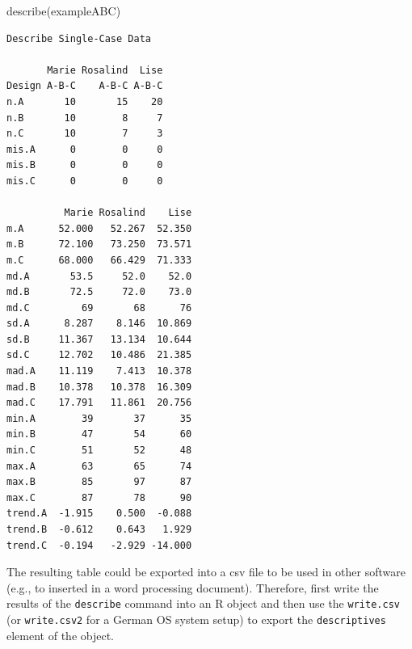 \documentclass[
]{book}
\newenvironment{Shaded}{\begin{snugshade}}{\end{snugshade}}
\newcommand{\AttributeTok}[1]{\textcolor[rgb]{0.77,0.63,0.00}{#1}}
\newcommand{\CommentTok}[1]{\textcolor[rgb]{0.56,0.35,0.01}{\textit{#1}}}
\newcommand{\FunctionTok}[1]{\textcolor[rgb]{0.00,0.00,0.00}{#1}}
\newcommand{\NormalTok}[1]{#1}
\newcommand{\OtherTok}[1]{\textcolor[rgb]{0.56,0.35,0.01}{#1}}
\newcommand{\SpecialCharTok}[1]{\textcolor[rgb]{0.00,0.00,0.00}{#1}}
\newcommand{\StringTok}[1]{\textcolor[rgb]{0.31,0.60,0.02}{#1}}
\begin{document}
\begin{Shaded}
\begin{Highlighting}[]
\FunctionTok{describe}\NormalTok{(exampleABC)}
\end{Highlighting}
\end{Shaded}

\begin{verbatim}
Describe Single-Case Data

       Marie Rosalind  Lise
Design A-B-C    A-B-C A-B-C
n.A       10       15    20
n.B       10        8     7
n.C       10        7     3
mis.A      0        0     0
mis.B      0        0     0
mis.C      0        0     0

          Marie Rosalind    Lise
m.A      52.000   52.267  52.350
m.B      72.100   73.250  73.571
m.C      68.000   66.429  71.333
md.A       53.5     52.0    52.0
md.B       72.5     72.0    73.0
md.C         69       68      76
sd.A      8.287    8.146  10.869
sd.B     11.367   13.134  10.644
sd.C     12.702   10.486  21.385
mad.A    11.119    7.413  10.378
mad.B    10.378   10.378  16.309
mad.C    17.791   11.861  20.756
min.A        39       37      35
min.B        47       54      60
min.C        51       52      48
max.A        63       65      74
max.B        85       97      87
max.C        87       78      90
trend.A  -1.915    0.500  -0.088
trend.B  -0.612    0.643   1.929
trend.C  -0.194   -2.929 -14.000
\end{verbatim}

The resulting table could be exported into a csv file to be used in other software (e.g., to inserted in a word processing document). Therefore, first write the results of the \texttt{describe} command into an R object and then use the \texttt{write.csv} (or \texttt{write.csv2} for a German OS system setup) to export the \texttt{descriptives} element of the object.

\begin{Shaded}
\end{Shaded}
\end{document}
